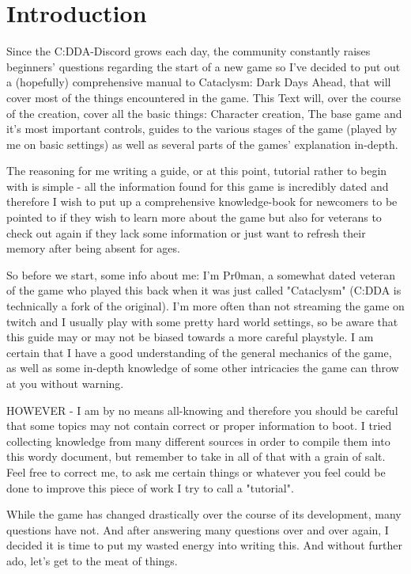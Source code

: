 \chapter{Introduction}
 
Since the C:DDA-Discord grows each day, the community constantly raises beginners' questions regarding the start of a new game so I've decided to put out a (hopefully) comprehensive manual to Cataclysm: Dark Days Ahead, that will cover most of the things encountered in the game. This Text will, over the course of the creation, cover all the basic things: Character creation, The base game and it's most important controls, guides to the various stages of the game (played by me on basic settings) as well as several parts of the games' explanation in-depth.

The reasoning for me writing a guide, or at this point, tutorial rather to begin with is simple - all the information found for this game is incredibly dated and therefore I wish to put up a comprehensive knowledge-book for newcomers to be pointed to if they wish to learn more about the game but also for veterans to check out again if they lack some information or just want to refresh their memory after being absent for ages.

So before we start, some info about me: I'm Pr0man, a somewhat dated veteran of the game who played this back when it was just called "Cataclysm" (C:DDA is technically a fork of the original). I'm more often than not streaming the game on twitch and I usually play with some pretty hard world settings, so be aware that this guide may or may not be biased towards a more careful playstyle. I am certain that I have a good understanding of the general mechanics of the game, as well as some in-depth knowledge of some other intricacies the game can throw at you without warning.

HOWEVER - I am by no means all-knowing and therefore you should be careful that some topics may not contain correct or proper information to boot. I tried collecting knowledge from many different sources in order to compile them into this wordy document, but remember to take in all of that with a grain of salt. Feel free to correct me, to ask me certain things or whatever you feel could be done to improve this piece of work I try to call a "tutorial".

While the game has changed drastically over the course of its development, many questions have not. And after answering many questions over and over again, I decided it is time to put my wasted energy into writing this. And without further ado, let's get to the meat of things.